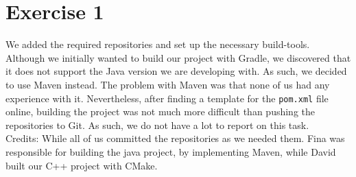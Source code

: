 \section{Exercise 1}
We added the required repositories and set up the necessary build-tools. Although we initially wanted to build our project with Gradle, we discovered that it does not support the Java version we are developing with.
As such, we decided to use Maven instead. The problem with Maven was that none of us had any experience with it. Nevertheless, after finding a template for the \texttt{pom.xml} file online, building the project was not much more difficult than pushing the repositories to Git.
As such, we do not have a lot to report on this task.\\
Credits: While all of us committed the repositories as we needed them. Fina was responsible for building the java project, by 
implementing Maven, while David built our C++ project with CMake.